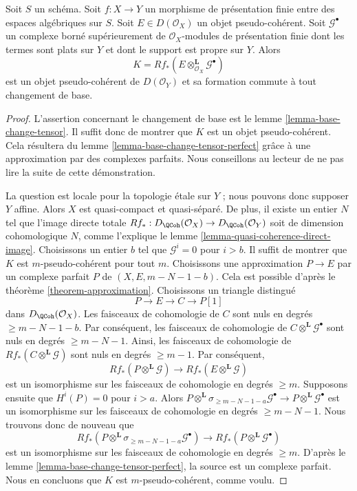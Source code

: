 \begin{lemma}
\label{lemma-base-change-tensor-pseudo-coherent}
Soit $S$ un schéma.
Soit $f : X \to Y$ un morphisme de présentation finie
entre des espaces algébriques sur $S$.
Soit $E \in D(\mathcal{O}_X)$ un objet pseudo-cohérent.
Soit $\mathcal{G}^\bullet$ un complexe borné supérieurement de
$\mathcal{O}_X$-modules de présentation finie dont les termes sont
plats sur $Y$ et dont le support est propre sur $Y$. Alors
$$
K = Rf_*(E \otimes_{\mathcal{O}_X}^\mathbf{L} \mathcal{G}^\bullet)
$$
est un objet pseudo-cohérent de $D(\mathcal{O}_Y)$ et sa formation
commute à tout changement de base.
\end{lemma}

\begin{proof}
L'assertion concernant le changement de base est le
lemme \ref{lemma-base-change-tensor}.
Il suffit donc de montrer que $K$ est un objet pseudo-cohérent.
Cela résultera du lemme \ref{lemma-base-change-tensor-perfect}
grâce à une approximation par des complexes parfaits. Nous conseillons au
lecteur de ne pas lire la suite de cette démonstration.

\medskip\noindent
La question est locale pour la topologie étale sur $Y$ ; nous pouvons donc
supposer $Y$ affine. Alors $X$ est quasi-compact et quasi-séparé. De plus, il
existe un entier $N$ tel que l'image directe totale
$Rf_* : D_\QCoh(\mathcal{O}_X) \to D_\QCoh(\mathcal{O}_Y)$
soit de dimension cohomologique $N$, comme l'explique le
lemme \ref{lemma-quasi-coherence-direct-image}.
Choisissons un entier $b$ tel que $\mathcal{G}^i = 0$ pour $i > b$.
Il suffit de montrer que $K$ est $m$-pseudo-cohérent pour
tout $m$. Choisissons une approximation $P \to E$ par un complexe parfait $P$
de $(X, E, m - N - 1 - b)$. Cela est possible d'après le
théorème \ref{theorem-approximation}.
Choisissons un triangle distingué
$$
P \to E \to C \to P[1]
$$
dans $D_\QCoh(\mathcal{O}_X)$. Les faisceaux de cohomologie de $C$ sont nuls
en degrés $\geq m - N - 1 - b$. Par conséquent, les faisceaux de cohomologie
de $C \otimes^\mathbf{L} \mathcal{G}^\bullet$ sont nuls en degrés
$\geq m - N - 1$.
Ainsi, les faisceaux de cohomologie de
$Rf_*(C \otimes^\mathbf{L} \mathcal{G})$ sont nuls en degrés $\geq m - 1$.
Par conséquent,
$$
Rf_*(P \otimes^\mathbf{L} \mathcal{G}) \to
Rf_*(E \otimes^\mathbf{L} \mathcal{G})
$$
est un isomorphisme sur les faisceaux de cohomologie en degrés $\geq m$.
Supposons ensuite que $H^i(P) = 0$ pour $i > a$. Alors
$
P \otimes^\mathbf{L} \sigma_{\geq m - N - 1 - a}\mathcal{G}^\bullet
\longrightarrow
P \otimes^\mathbf{L} \mathcal{G}^\bullet
$
est un isomorphisme sur les faisceaux de cohomologie en degrés
$\geq m - N - 1$.
Nous trouvons donc de nouveau que
$$
Rf_*(P \otimes^\mathbf{L} \sigma_{\geq m - N - 1 - a}\mathcal{G}^\bullet) \to
Rf_*(P \otimes^\mathbf{L} \mathcal{G}^\bullet)
$$
est un isomorphisme sur les faisceaux de cohomologie en degrés $\geq m$.
D'après le lemme \ref{lemma-base-change-tensor-perfect}, la source
est un complexe parfait.
Nous en concluons que $K$ est $m$-pseudo-cohérent, comme voulu.
\end{proof}

